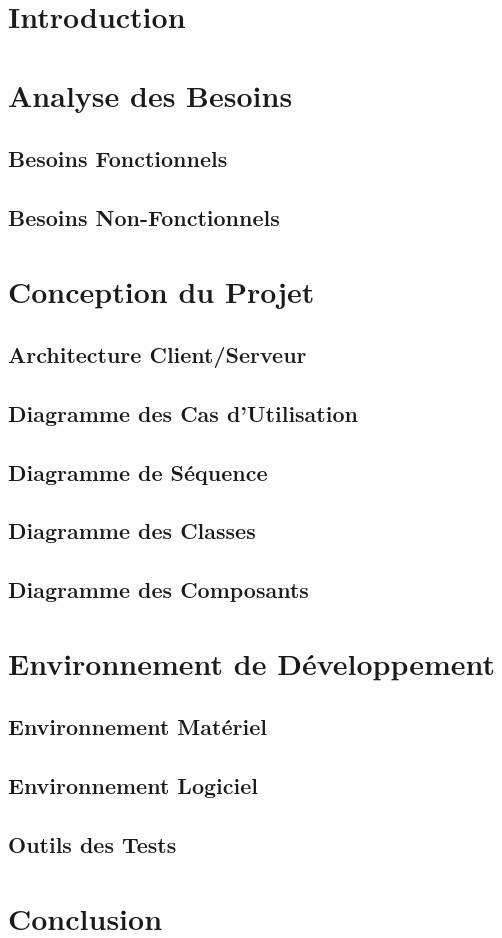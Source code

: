 \section{Introduction}

\section{Analyse des Besoins}

\subsection{Besoins Fonctionnels}

\subsection{Besoins Non-Fonctionnels}

\section{Conception du Projet}

\subsection{Architecture Client/Serveur}

\subsection{Diagramme des Cas d'Utilisation}

\subsection{Diagramme de Séquence}

\subsection{Diagramme des Classes}

\subsection{Diagramme des Composants}

\section{Environnement de Développement}

\subsection{Environnement Matériel}

\subsection{Environnement Logiciel}

\subsection{Outils des Tests}

\section{Conclusion}

